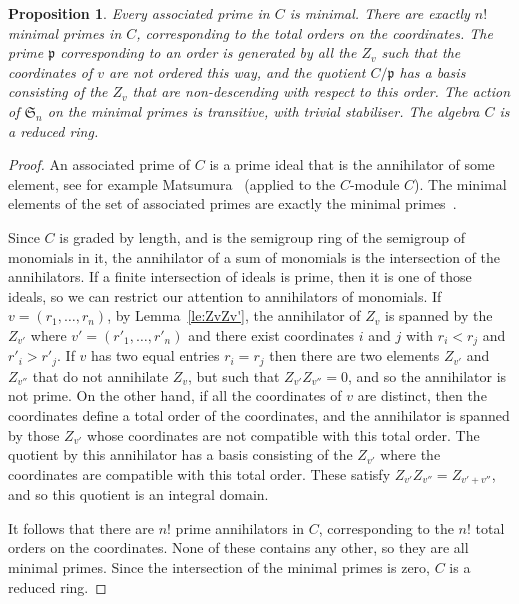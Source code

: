 \documentclass[12pt]{amsart}
\newcommand{\sym}[1]{\mathfrak{S}_{#1}}
\newcommand{\mfp}{\mathfrak{p}}
\numberwithin{equation}{section}
\newtheorem{proposition}[equation]{Proposition}
\theoremstyle{definition}
\begin{document}
\begin{proposition}\label{pr:minimal-primes}
Every associated prime in $C$ is minimal.
There are exactly $n!$ minimal primes in $C$, corresponding to the
total orders on the coordinates. The prime $\mfp$ corresponding to an
order is generated by all the $Z_v$ such that the coordinates of $v$ are
not ordered this way, and the quotient $C/\mfp$ has a basis consisting
of the $Z_v$ that are non-descending with respect to this order. The
action of $\sym{n}$ on the minimal primes is transitive, with trivial stabiliser.
The algebra $C$ is a reduced ring.
\end{proposition}
\begin{proof}
An associated prime of $C$ is a prime ideal that is the annihilator of some
element, see for example Matsumura~\cite[\S6]{Matsumura:1986a}
(applied to the $C$-module $C$). The
minimal elements of the set of associated primes are exactly the
minimal primes~\cite[Theorem~6.5\,(iii)]{Matsumura:1986a}.

Since $C$ is graded by length, and is the semigroup ring of the
semigroup of monomials in it, the annihilator of a sum of monomials is
the intersection of the annihilators. If a finite intersection of ideals is
prime, then it is one of those ideals, so we can restrict our
attention to annihilators of monomials. If $v=(r_1,\dots,r_n)$, 
by Lemma~\ref{le:ZvZv'}, the
annihilator of $Z_v$ is spanned by the $Z_{v'}$ where
$v'=(r'_1,\dots,r'_n)$ and there exist coordinates $i$ and $j$ with
$r_i<r_j$ and $r'_i>r'_j$. If $v$ has two equal entries $r_i=r_j$
then there are two elements $Z_{v'}$ and
$Z_{v''}$ that do not annihilate $Z_v$, but such that $Z_{v'}Z_{v''}=0$, and
so the annihilator is not prime. On the other hand, if all the
coordinates of $v$ are distinct, then the coordinates define a total
order of the coordinates, and the annihilator is spanned by
those $Z_{v'}$ whose coordinates are not compatible with this total
order. The quotient by this annihilator has a basis consisting of the
$Z_{v'}$ where the coordinates are compatible with this total order.
These satisfy $Z_{v'}Z_{v''}=Z_{v'+v''}$, and so this quotient is an
integral domain. 

It follows that there are $n!$ prime annihilators in $C$,
corresponding to the $n!$ total orders on the coordinates. None of
these contains any other, so they are all minimal primes.
Since the intersection of the minimal primes is zero, $C$ is a reduced ring.
\end{proof}
\end{document}
